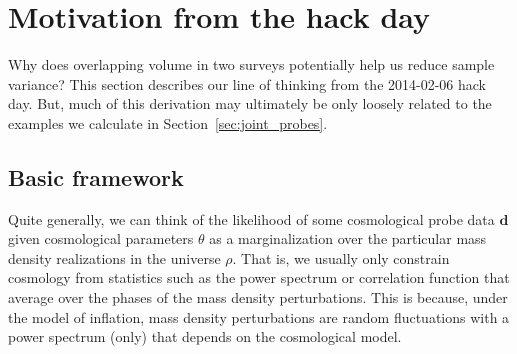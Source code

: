 \documentclass[preprint]{aastex}
\newcommand{\data}{\mathbf{d}}
\begin{document}





\appendix
\section{Motivation from the hack day}

Why does overlapping volume in two surveys potentially help us reduce sample variance?
This section describes our line of thinking from the 2014-02-06 hack day. 
But, much of this derivation may ultimately be only loosely related to the examples
we calculate in Section~\ref{sec:joint_probes}.

\subsection{Basic framework}
Quite generally, we can think of the likelihood of some cosmological probe data $\data$ given cosmological 
parameters $\theta$ as a marginalization over the particular mass density realizations in the universe $\rho$.
That is, we usually only constrain cosmology from statistics such as the power spectrum or correlation 
function that average over the phases of the mass density perturbations. This is because, under the model 
of inflation, mass density perturbations are random fluctuations with a power spectrum (only) that depends 
on the cosmological model.
\end{document}

